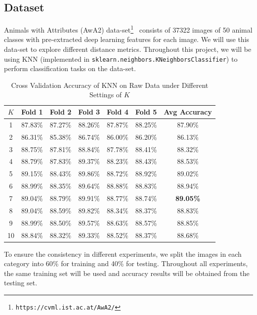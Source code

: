 
\subsection{Dataset}

Animals with Attributes (AwA2) data-set\footnote{\texttt{https://cvml.ist.ac.at/AwA2/}}~\cite{xian2018zero} consists of 37322 images of 50 animal classes with pre-extracted deep learning features for each image. We will use this data-set to explore different distance metrics. Throughout this project, we will be using KNN (implemented in \texttt{sklearn.neighbors.KNeighborsClassifier}) to perform classification tasks on the data-set.

\begin{table}[htbp]
\centering
\caption{Cross Validation Accuracy of KNN on Raw Data under Different Settings of $K$ }
\label{tab:cross-val}
\begin{tabular}{@{}ccccccc@{}}
\toprule
$K$    & Fold 1  & Fold 2  & Fold 3  & Fold 4  & Fold 5  & Avg Accuracy \\ \midrule
1   & 87.83\% & 87.27\% & 88.26\% & 87.87\% & 88.25\% & 87.90\%      \\
2   & 86.31\% & 85.38\% & 86.74\% & 86.00\% & 86.20\% & 86.13\%      \\
3   & 88.75\% & 87.81\% & 88.84\% & 87.78\% & 88.41\% & 88.32\%      \\
4   & 88.79\% & 87.83\% & 89.37\% & 88.23\% & 88.43\% & 88.53\%      \\
5   & 89.15\% & 88.43\% & 89.86\% & 88.72\% & 88.92\% & 89.02\%      \\
6   & 88.99\% & 88.35\% & 89.64\% & 88.88\% & 88.83\% & 88.94\%      \\
7   & 89.04\% & 88.79\% & 89.91\% & 88.77\% & 88.74\% & \textbf{89.05\%}      \\
8   & 89.04\% & 88.59\% & 89.82\% & 88.34\% & 88.37\% & 88.83\%      \\
9   & 88.99\% & 88.50\% & 89.57\% & 88.63\% & 88.57\% & 88.85\%      \\
10   & 88.84\% & 88.32\% & 89.33\% & 88.52\% & 88.37\% & 88.68\%      \\\bottomrule
\end{tabular}
\end{table}

To ensure the consistency in different experiments, we split the images in each category into 60\% for training and 40\% for testing. Throughout all experiments, the same training set will be used and accuracy results will be obtained from the testing set.

